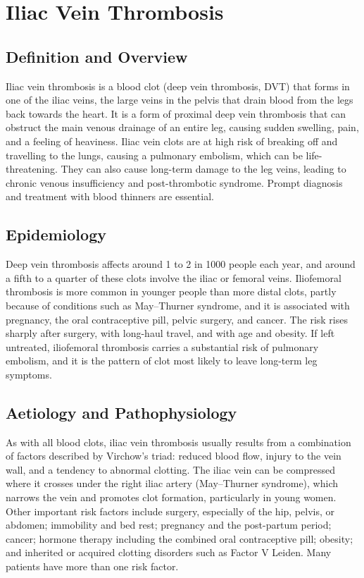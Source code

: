 \chapter{Iliac Vein Thrombosis}

\section*{Definition and Overview}
Iliac vein thrombosis is a blood clot (deep vein thrombosis, DVT) that forms in one of the iliac veins, the large veins in the pelvis that drain blood from the legs back towards the heart. It is a form of proximal deep vein thrombosis that can obstruct the main venous drainage of an entire leg, causing sudden swelling, pain, and a feeling of heaviness. Iliac vein clots are at high risk of breaking off and travelling to the lungs, causing a pulmonary embolism, which can be life-threatening. They can also cause long-term damage to the leg veins, leading to chronic venous insufficiency and post-thrombotic syndrome. Prompt diagnosis and treatment with blood thinners are essential.

\section*{Epidemiology}
Deep vein thrombosis affects around 1 to 2 in 1000 people each year, and around a fifth to a quarter of these clots involve the iliac or femoral veins. Iliofemoral thrombosis is more common in younger people than more distal clots, partly because of conditions such as May--Thurner syndrome, and it is associated with pregnancy, the oral contraceptive pill, pelvic surgery, and cancer. The risk rises sharply after surgery, with long-haul travel, and with age and obesity. If left untreated, iliofemoral thrombosis carries a substantial risk of pulmonary embolism, and it is the pattern of clot most likely to leave long-term leg symptoms.

\section*{Aetiology and Pathophysiology}
As with all blood clots, iliac vein thrombosis usually results from a combination of factors described by Virchow's triad: reduced blood flow, injury to the vein wall, and a tendency to abnormal clotting. The iliac vein can be compressed where it crosses under the right iliac artery (May--Thurner syndrome), which narrows the vein and promotes clot formation, particularly in young women. Other important risk factors include surgery, especially of the hip, pelvis, or abdomen; immobility and bed rest; pregnancy and the post-partum period; cancer; hormone therapy including the combined oral contraceptive pill; obesity; and inherited or acquired clotting disorders such as Factor V Leiden. Many patients have more than one risk factor.

